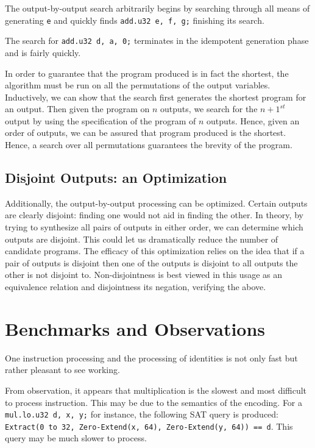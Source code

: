 \documentclass[letterpaper,twocolumn,10pt]{article}
\begin{document}
The output-by-output search arbitrarily begins by searching through
all means of generating \texttt{e} and quickly finds \texttt{add.u32 e, f, g;}
finishing its search.

The search for \texttt{add.u32 d, a, 0;}
terminates in the idempotent generation phase and is fairly quickly.

In order to guarantee that the program produced is in fact the shortest,
the algorithm must be run on all the permutations of the output variables.
Inductively, we can show that the search first generates the shortest
program for an output. Then given the program on $n$ outputs, we search
for the $n + 1^{st}$ output by using the specification of the program of
$n$ outputs. Hence, given an order of outputs, we can be assured that program
produced is the shortest. Hence, a search over all permutations guarantees the
brevity of the program.

\subsection{Disjoint Outputs: an Optimization}

Additionally, the output-by-output processing can be
optimized. Certain outputs are clearly disjoint: finding
one would not aid in finding the other. In theory, by
trying to synthesize all pairs of outputs in either order,
we can determine which outputs are disjoint. This could let
us dramatically reduce the number of candidate programs.
The efficacy of this optimization relies on the idea that
if a pair of outputs is disjoint then one of the outputs
is disjoint to all outputs the other is not disjoint to.
Non-disjointness is best viewed in this usage as an equivalence
relation and disjointness its negation, verifying the above.


\section{Benchmarks and Observations}

One instruction processing and the processing of identities is not only fast
but rather pleasant to see working.

From observation, it appears that multiplication is the slowest and most
difficult to process instruction. This may be due to the semantics of the
encoding. For a \texttt{mul.lo.u32 d, x, y;} for instance, the following SAT query
is produced: \texttt{Extract(0 to 32, Zero-Extend(x, 64), Zero-Extend(y, 64)) == d}.
This query may be much slower to process.
\end{document}
